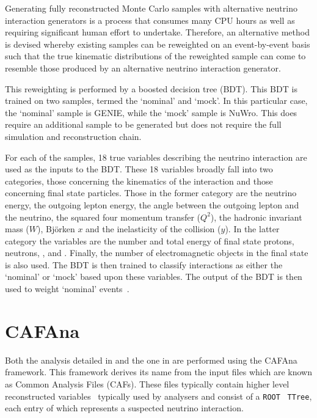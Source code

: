 Generating fully reconstructed Monte Carlo samples with alternative neutrino interaction generators is a process that consumes many CPU hours as well as requiring significant human effort to undertake.
Therefore, an alternative method is devised whereby existing samples can be reweighted on an event-by-event basis such that the true kinematic distributions of the reweighted sample can come to resemble those produced by an alternative neutrino interaction generator.

This reweighting is performed by a boosted decision tree (BDT).
This BDT is trained on two samples, termed the `nominal' and `mock'.
In this particular case, the `nominal' sample is GENIE, while the `mock' sample is NuWro.
This does require an additional sample to be generated but does not require the full simulation and reconstruction chain.

For each of the samples, 18 true variables describing the neutrino interaction are used as the inputs to the BDT.
These 18 variables broadly fall into two categories, those concerning the kinematics of the interaction and those concerning final state particles. Those in the former category are the neutrino energy, the outgoing lepton energy, the angle between the outgoing lepton and the neutrino, the squared four momentum transfer ($Q^{2}$), the hadronic invariant mass ($W$), Bj\"orken $x$ and the inelasticity of the collision ($y$).
In the latter category the variables are the number and total energy of final state protons, neutrons, \piplus, \piminus and \pizero. 
Finally, the number of electromagnetic objects in the final state is also used.
The BDT is then trained to classify interactions as either the `nominal' or `mock' based upon these variables.
The output of the BDT is then used to weight `nominal' events~\cite{vilelaBDT}.

\section{CAFAna}
\label{sec:dune_ndrwt:cafana}

Both the analysis detailed in  and the one in  are performed using the CAFAna framework.
This framework derives its name from the input files which are known as Common Analysis Files (CAFs).
These files typically contain higher level reconstructed variables~\cite{backhouse2015} typically used by analysers and consist of a \texttt{ROOT}~\cite{root} \texttt{TTree}, each entry of which represents a suspected neutrino interaction.

